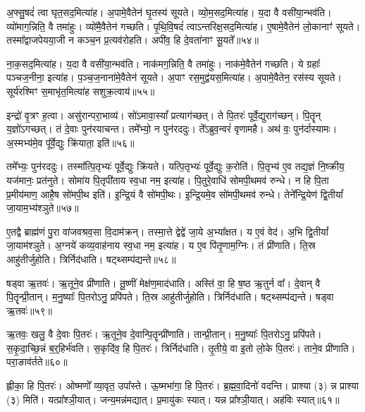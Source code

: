 अ॒फ्सु॒षदं॑ त्वा घृत॒सद॒मित्या॑ह।
अ॒पामे॒वैतेन॑ घृ॒तस्य॑ सूयते।
व्यो॒म॒सद॒मित्या॑ह।
य॒दा वै वसी॑या॒न्भव॑ति।
व्यो॑माग॒न्निति॒ वै तमा॑हुः।
व्यो॑मै॒वैतेन॑ गच्छति।
पृ॒थि॒वि॒षदं॑ त्वा\-ऽन्तरिक्ष॒सद॒मित्या॑ह।
ए॒षामे॒वैतेन॑ लो॒कानाꣳ॑ सूयते।
तस्मा᳚द्वाजपेयया॒जी न कञ्च॒न प्र॒त्यव॑रोहति।
अपी॑व॒ हि दे॒वता॑नाꣳ सू॒यते᳚॥५४॥\ip

ना॒क॒सद॒मित्या॑ह।
य॒दा वै वसी॑या॒न्भव॑ति।
नाक॑मग॒न्निति॒ वै तमा॑हुः।
नाक॑मे॒वैतेन॑ गच्छति।
ये ग्रहाः᳚ पञ्चज॒नीना॒ इत्या॑ह।
प॒ञ्च॒ज॒नाना॑मे॒वैतेन॑ सूयते।
अ॒पाꣳ रस॒मुद्व॑यस॒मि\-त्या॑ह।
अ॒पामे॒वैतेन॒ रस॑स्य सूयते।
सूर्य॑रश्मिꣳ स॒माभृ॑त॒मित्या॑ह सशुक्र॒त्वाय॑॥५५॥\ip\anuvakamend[ग॒च्छ॒ति॒ सू॒यते॒ नव॑ च]

इन्द्रो॑ वृ॒त्रꣳ ह॒त्वा।
असु॑रान्परा॒भाव्य॑।
सो॑ऽमावा॒स्यां᳚ प्रत्याग॑च्छत्।
ते पि॒तरः॑ पूर्वे॒द्युराग॑च्छन्।
पि॒तॄन् य॒ज्ञो॑\-ऽगच्छत्।
तं दे॒वाः पुन॑रयाचन्त।
तमे᳚भ्यो॒ न पुन॑रददुः।
ते᳚ऽब्रुव॒न्वरं॑ वृणामहै।
अथ॑ वः॒ पुन॑र्दास्यामः।
अ॒स्मभ्य॑मे॒व पू᳚र्वे॒द्युः क्रि॑याता॒ इति॑॥५६॥\ip

तमे᳚भ्यः॒ पुन॑रददुः।
तस्मा᳚त्पि॒तृभ्यः॑ पूर्वे॒द्युः क्रि॑यते।
यत्पि॒तृभ्यः॑ पूर्वे॒द्युः क॒रोति॑।
पि॒तृभ्य॑ ए॒व तद्य॒ज्ञं नि॒ष्क्रीय॒ यज॑मानः॒ प्रत॑नुते।
सोमा॑य पि॒तृपी॑ताय स्व॒धा नम॒ इत्या॑ह।
पि॒तुरे॒वाधि॑ सोमपी॒थमव॑ रुन्धे।
न हि पि॒ता प्र॒मीय॑माण॒ आहै॒ष सो॑मपी॒थ इति॑।
इ॒न्द्रि॒यं वै सो॑मपी॒थः।
इ॒न्द्रि॒यमे॒व सो॑मपी॒थमव॑ रुन्धे।
तेने᳚न्द्रि॒येण॑ द्वि॒तीयां᳚ जा॒याम॒भ्य॑श्ञुते॥५७॥\ip

ए॒तद्वै ब्राह्म॑णं पु॒रा वा॑जवश्रव॒सा वि॒दाम॑क्रन्।
तस्मा॒त्ते द्वेद्वे॑ जा॒ये अ॒भ्या᳚क्षत।
य ए॒वं वेद॑।
अ॒भि द्वि॒तीयां᳚ जा॒याम॑श्ञुते।
अ॒ग्नये॑ कव्य॒वाह॑नाय स्व॒धा नम॒ इत्या॑ह।
य ए॒व पि॑तृ॒णाम॒ग्निः।
तं प्री॑णाति।
ति॒स्र आहु॑तीर्जुहोति।
त्रिर्निद॑धाति।
षट्थ्सम्प॑द्यन्ते॥५८॥\ip

षड्वा ऋ॒तवः॑।
ऋ॒तूने॒व प्री॑णाति।
तू॒ष्णीं मेक्ष॑ण॒माद॑धाति।
अस्ति॑ वा॒ हि ष॒ष्ठ ऋ॒तुर्न वा᳚।
दे॒वान् वै पि॒तॄन्प्री॒तान्।
म॒नु॒ष्याः᳚ पि॒तरोऽनु॒ प्रपि॑पते।
ति॒स्र आहु॑तीर्जुहोति।
त्रिर्निद॑धाति।
षट्थ्सम्प॑द्यन्ते।
षड्वा ऋ॒तवः॑॥५९॥\ip

ऋ॒तवः॒ खलु॒ वै दे॒वाः पि॒तरः॑।
ऋ॒तूने॒व दे॒वान्पि॒तॄन्प्री॑णाति।
तान्प्री॒तान्।
म॒नु॒ष्याः᳚ पि॒तरोऽनु॒ प्रपि॑पते।
स॒कृ॒दा॒च्छि॒न्नं ब॒र्॒\mbox{}हिर्भ॑वति।
स॒कृदि॑व॒ हि पि॒तरः॑।
त्रिर्निद॑धाति।
तृ॒तीये॒ वा इ॒तो लो॒के पि॒तरः॑।
ताने॒व प्री॑णाति।
परा॒ङाव॑र्तते॥६०॥\ip

ह्लीका॒ हि पि॒तरः॑।
ओष्मणो᳚ व्या॒वृत॒ उपा᳚स्ते।
ऊ॒ष्मभा॑गा॒ हि पि॒तरः॑।
ब्र॒ह्म॒वा॒दिनो॑ वदन्ति।
प्राश्या (३) न्न प्राश्या (३) मिति॑।
यत्प्रा᳚श्ञी॒यात्।
जन्य॒मन्न॑मद्यात्।
प्र॒मायु॑कः स्यात्।
यन्न प्रा᳚श्ञी॒यात्।
अह॑विः स्यात्॥६१॥\ip

